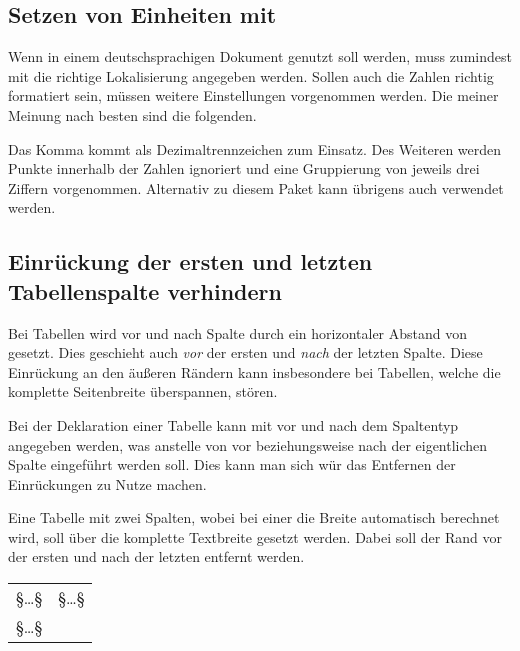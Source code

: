 \documentclass[%
  english,ngerman,%
  headings=optiontoheadandtoc,captions=tableheading,numbers=noenddot,%
  chapterpage,cdfoot,%
]{tudscrman}
\begin{document}
\subsection{Setzen von Einheiten mit }\label{sec:tat:siunitx}
Wenn  in einem deutschsprachigen Dokument genutzt soll
werden, muss zumindest mit  die richtige 
Lokalisierung angegeben werden. Sollen auch die Zahlen richtig formatiert sein, 
müssen weitere Einstellungen vorgenommen werden. Die meiner Meinung nach besten 
sind die folgenden.
\begin{code}
\end{code}
Das Komma kommt als Dezimaltrennzeichen zum Einsatz. Des Weiteren werden Punkte 
innerhalb der Zahlen ignoriert und eine Gruppierung von jeweils drei Ziffern 
vorgenommen. Alternativ zu diesem Paket kann übrigens auch  
verwendet werden.


\subsection{Einrückung der ersten und letzten Tabellenspalte verhindern}%
\label{sec:tat:table}
Bei Tabellen wird vor und nach Spalte durch  ein horizontaler 
Abstand von  gesetzt. Dies geschieht auch \emph{vor} der 
ersten und \emph{nach} der letzten Spalte. Diese Einrückung an den äußeren 
Rändern kann insbesondere bei Tabellen, welche die komplette Seitenbreite 
überspannen, stören.

Bei der Deklaration einer Tabelle kann mit \PParameter{\dots} vor und 
nach dem Spaltentyp angegeben werden, was anstelle von  vor 
beziehungsweise nach der eigentlichen Spalte eingeführt werden soll. Dies kann 
man sich wür das Entfernen der Einrückungen zu Nutze machen.

\begin{Example}
Eine Tabelle mit zwei Spalten, wobei bei einer die Breite automatisch berechnet 
wird, soll über die komplette Textbreite gesetzt werden. Dabei soll der Rand vor 
der ersten und nach der letzten entfernt werden.
\begin{code}[escapechar=§]
\begin{tabularx}{\textwidth}{@{}lX@{}}
§\dots§ & §\dots§ \tabularnewline
§\dots§
\end{tabularx}
\end{code}
\end{Example}
\end{document}
